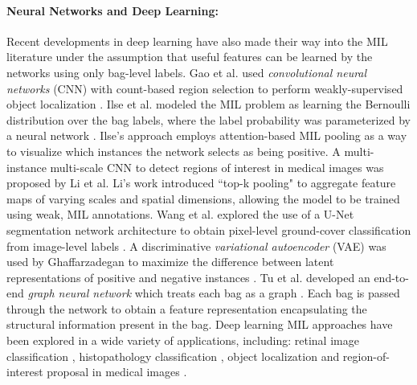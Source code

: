 \paragraph{Neural Networks and Deep Learning:}

Recent developments in deep learning have also made their way into the MIL literature under the assumption that useful features can be learned by the networks using only bag-level labels.  Gao et al. used \textit{convolutional neural networks} (CNN) with count-based region selection to perform weakly-supervised object localization \citep{Gao2017CountGuidedWeaklySupervisedLocalization}.  Ilse et al. modeled the MIL problem as learning the Bernoulli distribution over the bag labels, where the label probability was parameterized by a neural network \citep{Ilse2018AttentionBasedDeepMIL}.  Ilse's approach employs attention-based MIL pooling as a way to visualize which instances the network selects as being positive.  A multi-instance multi-scale CNN to detect regions of interest in medical images \citep{Li2019CNNMedicalImageClassification} was proposed by Li et al.  Li's work introduced ``top-k pooling" to aggregate feature maps of varying scales and spatial dimensions, allowing the model to be trained using weak, MIL annotations.  Wang et al. explored the use of a U-Net segmentation network architecture to obtain pixel-level ground-cover classification from image-level labels \citep{Wang2020WSDeepLearningRemoteSensing}.  A discriminative \textit{variational autoencoder} (VAE) was used by Ghaffarzadegan to maximize the difference between latent representations of positive and negative instances \citep{Ghaffarzadegan2018MILVAE}.  Tu et al. developed an end-to-end \textit{graph neural network} which treats each bag as a graph \citep{Tu2019MILGraphNN}.  Each bag is passed through the network to obtain a feature representation encapsulating the structural information present in the bag.  Deep learning MIL approaches have been explored in a wide variety of applications, including: retinal image classification \citep{Tu2019MILGraphNN}, histopathology classification \citep{Ilse2018AttentionBasedDeepMIL}, object localization \citep{Gao2017CountGuidedWeaklySupervisedLocalization} and region-of-interest proposal in medical images \citep{Li2019CNNMedicalImageClassification}.



